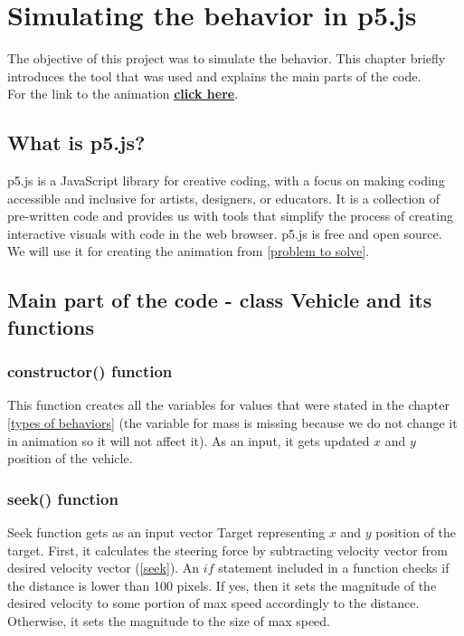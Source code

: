 \documentclass[10pt,twoside,english,a4paper]{article}
\begin{document}
\section{Simulating the behavior in p5.js} \label{simulation} 

The objective of this project was to simulate the behavior. This chapter briefly
introduces the tool that was used and explains the main parts of the code.\\
For the link to the animation \textbf{\underline{\href{https://editor.p5js.org/RichardCernansky/sketches/E0zAXshWw}{click here}}}.

\subsection{What is p5.js?} \label{p5 char} 

p5.js is a JavaScript library for creative coding, with a focus on 
making coding accessible and inclusive for artists, designers, or 
educators. It is a collection of pre-written code and provides us 
with tools that simplify the process of creating interactive visuals 
with code in the web browser. p5.js is free and open source. We 
will use it for creating the animation from \ref{problem to solve}. 

\subsection{Main part of the code - class Vehicle and its functions} \label{class Vehicle} 

\subsubsection{constructor() function} \label{constructorf} 

This function creates all the variables for values that were stated in the 
chapter \ref{types of behaviors} (the variable for mass is missing because we do not change it in animation
so it will not affect it). As an input, it gets updated $x$ and $y$ position
of the vehicle. 

\subsubsection{seek() function} \label{seekf} 

Seek function gets as an input vector Target representing $x$ and $y$ position
of the target. First, it calculates the steering force by subtracting velocity vector
from desired velocity vector (\ref{seek}). An $if$ statement included in a function checks if 
the distance is lower than 100 pixels. If yes, then it sets the magnitude of the 
desired velocity to some portion of max speed accordingly to the distance. 
Otherwise, it sets the magnitude to the size of max speed.
\end{document}
